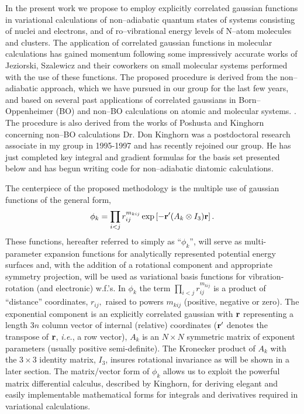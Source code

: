 In the present work we propose to employ explicitly correlated
gaussian functions in variational calculations of 
non--adiabatic quantum states of systems 
consisting of nuclei and electrons, and of
ro--vibrational
energy levels of N--atom molecules and clusters. 
The application of correlated gaussian functions in
molecular calculations has gained momentum
following some impressively accurate 
works of Jeziorski, Szalewicz and
their coworkers on small molecular systems performed
with the use of these functions.
\cite{sz1}
The proposed procedure is derived from
the non--adiabatic approach, which we have pursued in our group
for the last few years, and based on several past applications
of correlated gaussians in Born--Oppenheimer (BO) 
and non--BO calculations on atomic
and molecular systems.
\cite{A2,A3,A6,A8,%
A14,%
A16,%
A20,A21,%
A27,%
A37,%
A38,A382,A383,%
kozlowski91,kozlowski92a,kozlowski92b,kozlowski92c}.
The procedure is also derived from the works 
of Poshusta and Kinghorn
concerning non--BO calculations
\cite{Poshusta83,Kinghorn93,Kinghorn95b}
Dr. Don Kinghorn was a postdoctoral research associate 
in my group in 1995-1997 and has
recently rejoined our group. He has just completed key integral and
gradient formulas for the basis set presented below and has begun
writing code for non--adiabatic diatomic calculations. 

The centerpiece of the 
proposed methodology is the multiple use of 
gaussian functions of the
general form, 
\begin{equation}
\phi _k=\prod_{i<j}r_{ij}^{m_{kij}}\exp \left[ -{\bf r}^{\prime
}(A_k\otimes I_3){\bf r}\right] .  
\label{basisfcn}
\end{equation}
These functions, hereafter referred to simply as ``$\phi _k$'', will serve
as multi-parameter expansion functions for analytically represented
potential energy surfaces and, with the addition of a rotational component
and appropriate symmetry projection, will be used as variational basis
functions for vibration-rotation (and electronic) w.f.'s. In $\phi
_k $ the term $\prod_{i<j}r_{ij}^{m_{kij}}$ is a product of ``distance''
coordinates, $r_{ij},$ raised to powers $m_{kij}$ (positive, negative
\cite{kpc}
or zero).
 The exponential component is an explicitly correlated gaussian with $%
{\bf r}$ representing a length $3n$ column vector of internal (relative)
coordinates (${\bf r}^{\prime }$ denotes the transpose of ${\bf r}$,
{\it i.e.}, a row vector), $A_k$ is an 
$N\times N$ symmetric matrix of exponent
parameters (usually positive semi-definite). The Kronecker product of $A_k$
with the $3\times 3$ identity matrix, $I_3$, insures rotational invariance
as will be shown in a later section. The matrix/vector form of $\phi _k$
allows us to exploit the powerful matrix differential calculus, described by
Kinghorn\cite{Kinghorn95a}, for deriving elegant and easily implementable
mathematical forms for integrals and derivatives required in variational
calculations.

